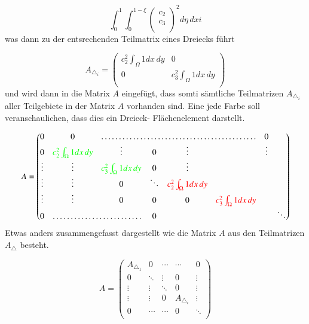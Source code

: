 \begin{equation}
			\int_0^1 \int_0^{1 - \xi} \left( \begin{array}{c} c_2 \\ c_3\\	
\end{array} \right)^2 d\eta \, dxi
			\label{fem:Minimal2LinAlgA}
\end{equation}
was dann zu der entsrechenden Teilmatrix eines Dreiecks führt

\begin{equation}
	A_{\triangle_i} = \left( \begin{array}{cc}
	c_2^2 \int_{\Omega} 1 dx \, dy & 0  \\ 
	0 & c_3^2 \int_{\Omega} 1 dx \, dy  \\
	\end{array}\right)
	\label{fem:TeilmatrixA}
\end{equation}
und wird dann in die Matrix $A$ eingefügt, dass  somti sämtliche Teilmatrizen $A_{\triangle_i}$ aller Teilgebiete in der Matrix $A$ vorhanden sind. Eine jede Farbe soll veranschaulichen, dass dies ein Dreieck- Flächenelement darstellt.

\begin{equation}
 A = \begin{pmatrix} 0 & 0 & \hdotsfor{4} & 0 \\
	0 & \textcolor{green}{ c_2^2 \int_{\Omega} 1 dx \, dy }& \vdots & 0 & \vdots & & \vdots \\
	\vdots & \vdots & \textcolor{green}{c_3^2 \int_{\Omega} 1 dx \, dy }& 0 & \vdots  & & \\
	\vdots & \vdots & 0 & \ddots & \textcolor{red}{ c_2^2 \int_{\Omega} 1 dx \, dy }& & \\
	\vdots & \vdots & 0 & 0 & 0 & \textcolor{red}{c_3^2 \int_{\Omega} 1 dx \, dy} & \\
	0 & \hdotsfor{2} & 0 &  & & &  \ddots  \\
	\end{pmatrix}
	\label{fem:MatrixA}
\end{equation}
Etwas anders zusammengefasst dargestellt wie die Matrix $A$ aus den Teilmatrizen $A_{\triangle}$ besteht.

\begin{equation}
 A =	\begin{pmatrix}
	A_{\triangle_1} & 0 & \cdots & \cdots & 0 \\
	0 & \ddots & \vdots & 0 & \vdots \\
	\vdots & \vdots & \ddots & 0 & \vdots \\
	\vdots & \vdots & 0 & A_{\triangle_i} & \vdots \\
	0 & \cdots & \cdots & 0 &  \ddots \\
	\end{pmatrix}
\end{equation}

